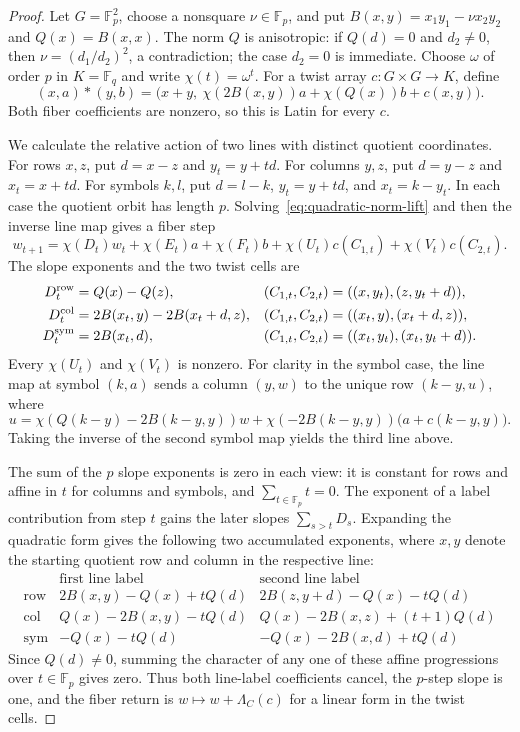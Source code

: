 \begin{proof}
Let $G=\mathbb F_p^2$, choose a nonsquare $\nu\in\mathbb F_p$, and put
$B(x,y)=x_1y_1-\nu x_2y_2$ and $Q(x)=B(x,x)$.  The norm $Q$ is anisotropic:
if $Q(d)=0$ and $d_2\ne0$, then $\nu=(d_1/d_2)^2$, a contradiction;
the case $d_2=0$ is immediate.  Choose $\omega$ of order $p$ in
$K=\mathbb F_q$ and write $\chi(t)=\omega^t$.  For a twist array
$c:G\times G\to K$, define
\begin{equation}\label{eq:quadratic-norm-lift}
 (x,a)*(y,b)=\bigl(x+y,\ \chi(2B(x,y))a+\chi(Q(x))b+c(x,y)\bigr).
\end{equation}
Both fiber coefficients are nonzero, so this is Latin for every $c$.

We calculate the relative action of two lines with distinct quotient
coordinates.  For rows $x,z$, put $d=x-z$ and $y_t=y+td$.  For columns
$y,z$, put $d=y-z$ and $x_t=x+td$.  For symbols $k,l$, put $d=l-k$,
$y_t=y+td$, and $x_t=k-y_t$.  In each case the quotient orbit has length
$p$.  Solving~\eqref{eq:quadratic-norm-lift} and then the inverse line
map gives a fiber step
\[
 w_{t+1}=\chi(D_t)w_t+\chi(E_t)a+\chi(F_t)b
             +\chi(U_t)c(C_{1,t})+\chi(V_t)c(C_{2,t}).
\]
The slope exponents and the two twist cells are
\begin{align*}
 D_t^{\rm row}&=Q(x)-Q(z),
 & (C_{1,t},C_{2,t})&=((x,y_t),(z,y_t+d)),\\
 D_t^{\rm col}&=2B(x_t,y)-2B(x_t+d,z),
 & (C_{1,t},C_{2,t})&=((x_t,y),(x_t+d,z)),\\
 D_t^{\rm sym}&=2B(x_t,d),
 & (C_{1,t},C_{2,t})&=((x_t,y_t),(x_t,y_t+d)).
\end{align*}
Every $\chi(U_t)$ and $\chi(V_t)$ is nonzero.  For clarity in the
symbol case, the line map at symbol $(k,a)$ sends a column $(y,w)$ to
the unique row $(k-y,u)$, where
\[
 u=\chi(Q(k-y)-2B(k-y,y))w
   +\chi(-2B(k-y,y))\bigl(a+c(k-y,y)\bigr).
\]
Taking the inverse of the second symbol map yields the third line above.

The sum of the $p$ slope exponents is zero in each view: it is constant
for rows and affine in $t$ for columns and symbols, and
$\sum_{t\in\mathbb F_p}t=0$.  The exponent of a label contribution from
step $t$ gains the later slopes $\sum_{s>t}D_s$.  Expanding the quadratic
form gives the following two accumulated exponents, where $x,y$ denote
the starting quotient row and column in the respective line:
\[
\begin{array}{c|c|c}
 &\text{first line label}&\text{second line label}\\ \hline
\mathrm{row}
 &2B(x,y)-Q(x)+tQ(d)
 &2B(z,y+d)-Q(x)-tQ(d)\\
\mathrm{col}
 &Q(x)-2B(x,y)-tQ(d)
 &Q(x)-2B(x,z)+(t+1)Q(d)\\
\mathrm{sym}
 &-Q(x)-tQ(d)
 &-Q(x)-2B(x,d)+tQ(d)
\end{array}
\]
Since $Q(d)\ne0$, summing the character of any one of these affine
progressions over $t\in\mathbb F_p$ gives zero.  Thus both line-label
coefficients cancel, the $p$-step slope is one, and the fiber return is
$w\mapsto w+\Lambda_C(c)$ for a linear form in the twist cells.


\end{proof}

